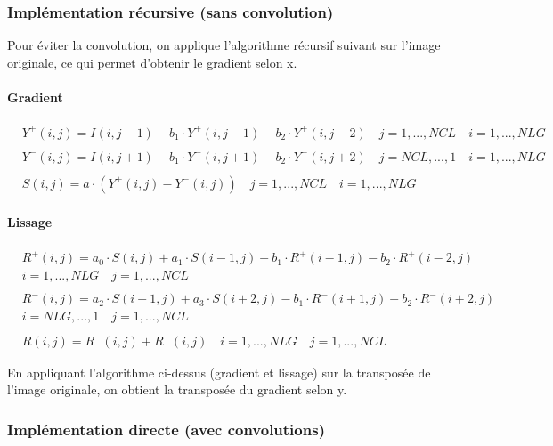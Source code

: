 \subsubsection{Implémentation récursive (sans convolution)}\label{algorithme_recursif}

Pour éviter la convolution, on applique l’algorithme récursif suivant sur l'image originale, ce qui permet d'obtenir le gradient selon x.

\paragraph{Gradient}

\begin{align*}
& Y^+(i,j)=I(i,j-1)-b_1 \cdot Y^+(i,j-1)-b_2 \cdot Y^+(i,j-2) \quad j=1,...,NCL \quad i=1,...,NLG \\
& \\
& Y^-(i,j)=I(i,j+1)-b_1 \cdot Y^-(i,j+1) - b_2 \cdot Y^-(i,j+2) \quad j=NCL,...,1 \quad i= 1,...,NLG \\
& \\
& S(i,j)=a \cdot (Y^+(i,j)-Y^-(i,j)) \quad j=1,...,NCL \quad i=1,...,NLG
\end{align*}

\paragraph{Lissage}

\begin{align*}
& R^+(i,j)=a_0 \cdot S(i,j) + a_1 \cdot S(i-1,j) - b_1 \cdot R^+(i-1,j) - b_2 \cdot R^+(i-2,j) \\
& i=1,...,NLG \quad j=1,...,NCL \\
& \\
& R^-(i,j) = a_2 \cdot S(i+1,j) + a_3 \cdot S(i+2,j) - b_1 \cdot R^-(i+1,j) - b_2 \cdot R^-(i+2,j) \\
& i=NLG,...,1 \quad j=1,...,NCL \\
& \\
&  R(i,j)=R^-(i,j) + R^+(i,j) \quad i=1,...,NLG \quad j=1,...,NCL
\end{align*}

En appliquant l'algorithme ci-dessus (gradient et lissage) sur la transposée de l'image originale, on obtient la transposée du gradient selon y.

\subsubsection{Implémentation directe (avec convolutions)}\label{algorithme_direct}

